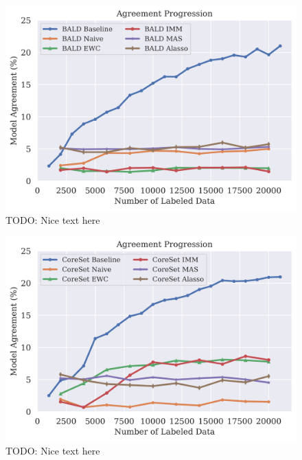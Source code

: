 \begin{figure}[h]
    \centering
    \includegraphics[width=0.8\linewidth]{images/results_CALMS/cifar100_label_bald.png}
    \caption[Agreement Comparison for Model Stealing on CIFAR10 using the top1-label and the Active Learning strategy BALD]{TODO: Nice text here}
    \label{fig:CALMSCIFAR10LabelBALD}
\end{figure}

\begin{figure}[h]
    \centering
    \includegraphics[width=0.8\linewidth]{images/results_CALMS/cifar100_label_coreset.png}
    \caption[Agreement Comparison for Model Stealing on CIFAR10 using the top1-label and the Active Learning strategy CoreSet]{TODO: Nice text here}
    \label{fig:CALMSCIFAR10LabelCoreSet}
\end{figure}

